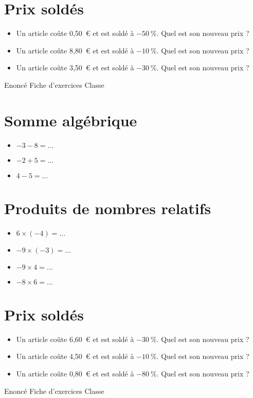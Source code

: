 \documentclass[a4paper,11pt,fleqn]{article}
\begin{document}
\section{Prix soldés}
\begin{itemize}

  \item Un article coûte 0,50~€ et est soldé à $-50~\%$. Quel est son nouveau prix ?
  \item Un article coûte 8,80~€ et est soldé à $-10~\%$. Quel est son nouveau prix ?
  \item Un article coûte 3,50~€ et est soldé à $-30~\%$. Quel est son nouveau prix ?
\end{itemize}
\newpage
\setcounter{exo}{0}
\setcounter{section}{0}
{Enoncé} \hfill {\huge Fiche d'exercices } \hfill {Classe}

\section{Somme algébrique}
\begin{itemize}

  \item $-3 -8=\ldots$
  \item $-2 +5=\ldots$
  \item $4 -5=\ldots$
\end{itemize}


\section{Produits de nombres relatifs}
\begin{itemize}

  \item $6\times(-4)=\ldots$
  \item $-9\times(-3)=\ldots$
  \item $-9\times4=\ldots$
  \item $-8\times6=\ldots$
\end{itemize}


\section{Prix soldés}
\begin{itemize}

  \item Un article coûte 6,60~€ et est soldé à $-30~\%$. Quel est son nouveau prix ?
  \item Un article coûte 4,50~€ et est soldé à $-10~\%$. Quel est son nouveau prix ?
  \item Un article coûte 0,80~€ et est soldé à $-80~\%$. Quel est son nouveau prix ?
\end{itemize}
\newpage
\setcounter{exo}{0}
\setcounter{section}{0}
{Enoncé} \hfill {\huge Fiche d'exercices } \hfill {Classe}
\end{document}
